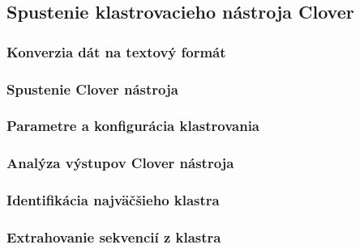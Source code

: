 \subsection{Spustenie klastrovacieho nástroja Clover}

\subsubsection{Konverzia dát na textový formát}


\subsubsection{Spustenie Clover nástroja}


\subsubsection{Parametre a konfigurácia klastrovania}


\subsubsection{Analýza výstupov Clover nástroja}


\subsubsection{Identifikácia najväčšieho klastra}


\subsubsection{Extrahovanie sekvencií z klastra}


